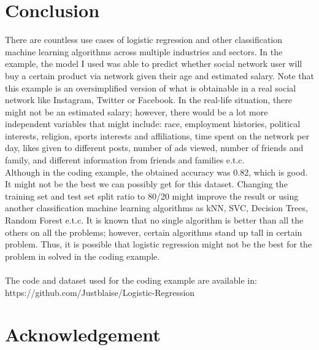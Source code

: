 \documentclass[conference]{IEEEtran}
\begin{document}
\section{Conclusion}
There are countless use cases of logistic regression and other classification machine learning algorithms across multiple industries and sectors. In the example,  the model I used was able to predict whether social network user will buy a certain product via network given their age and estimated salary. Note that this example is an oversimplified version of what is obtainable in a real social network like Instagram, Twitter  or Facebook. In the real-life situation, there might not be an estimated salary; however, there would be a lot more independent variables that might include: race, employment histories, political interests, religion, sports interests and affiliations, time spent on the network per day, likes given to different posts, number of ads viewed, number of friends and family, and different information from friends and families e.t.c.\\
Although in the coding example, the obtained accuracy was 0.82, which is good. It might not be the best we can possibly get for this dataset. Changing the training set and test set split ratio to 80/20 might improve the result or using another classification machine learning algorithms as kNN, SVC, Decision Trees, Random Forest e.t.c. It is known that no single algorithm is better than all the others on all the problems; however, certain algorithms stand up tall in certain problem\cite{bb6}. Thus, it is possible that logistic regression might not be the best for the problem in solved in the coding example.\\
\\
The code and dataset used for the coding example are available in:
https://github.com/Justblaise/Logistic-Regression

\section*{Acknowledgement}











\end{document}
